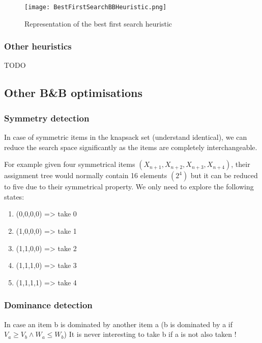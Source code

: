 \begin{figure}[!ht]
    \centering
    \texttt{[image: BestFirstSearchBBHeuristic.png]}
    \caption{Representation of the best first search heuristic}
    \label{fig:Knapsack_example}
\end{figure}
\FloatBarrier

\subsubsection{Other heuristics}

TODO

\subsection{Other B\&B optimisations}

\subsubsection{Symmetry detection}

In case of symmetric items in the knapsack set (understand identical), we can reduce the
search space significantly as the items are completely interchangeable.\newline

For example given four symmetrical items $(X_{n+1}, X_{n+2}, X_{n+3}, X_{n+4})$, 
their assignment tree would normally contain 16 elements $(2^4)$ but it can 
be reduced to five due to their symmetrical property. 
We only need to explore the following states:

\begin{enumerate}
	\item (0,0,0,0) => take 0
	\item (1,0,0,0) => take 1
	\item (1,1,0,0) => take 2
	\item (1,1,1,0) => take 3
	\item (1,1,1,1) => take 4
\end{enumerate}

\subsubsection{Dominance detection}

In case an item b is dominated by another item a
(b is dominated by a if $V_a \geq V_b \wedge W_a \leq W_b$)
It is never interesting to take b if a is not also taken ! \newline

